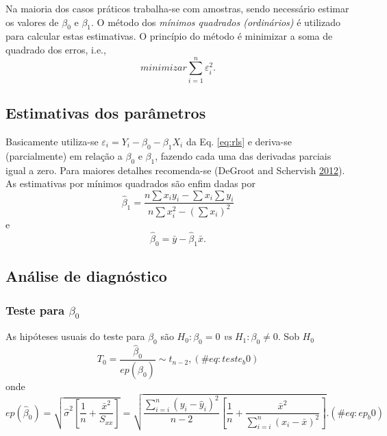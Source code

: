 \documentclass[
]{book}
\theoremstyle{definition}
\theoremstyle{definition}
\theoremstyle{definition}
\theoremstyle{remark}
\begin{document}
Na maioria dos casos práticos trabalha-se com amostras, sendo necessário estimar os valores de \(\beta_0\) e \(\beta_1\). O método dos \emph{mínimos quadrados (ordinários)} é utilizado para calcular estas estimativas. O princípio do método é minimizar a soma de quadrado dos erros, i.e.,
\begin{equation}
minimizar \sum_{i=1}^n \varepsilon_{i}^{2}.
\label{eq:mqo}
\end{equation}

\hypertarget{estimativas-dos-paruxe2metros}{%
\subsection{Estimativas dos parâmetros}\label{estimativas-dos-paruxe2metros}}

Basicamente utiliza-se \(\varepsilon_{i} = Y_{i} - \beta_0 - \beta_1 X_i\) da Eq. \eqref{eq:rls} e deriva-se (parcialmente) em relação a \(\beta_0\) e \(\beta_1\), fazendo cada uma das derivadas parciais igual a zero. Para maiores detalhes recomenda-se (DeGroot and Schervish \protect\hyperlink{ref-degroot2012probability}{2012}). As estimativas por mínimos quadrados são enfim dadas por
\begin{equation}
\hat{\beta}_1 = \frac{n \sum{x_i y_i} - \sum{x_i} \sum{y_i}}{n \sum{x_i^2} - (\sum{x_i})^2} 
\label{eq:beta1}
\end{equation}
e
\begin{equation}
\hat{\beta}_0 = \bar{y} - \hat{\beta}_1 \bar{x}.
\label{eq:beta0}
\end{equation}

\hypertarget{anuxe1lise-de-diagnuxf3stico}{%
\subsection{Análise de diagnóstico}\label{anuxe1lise-de-diagnuxf3stico}}

\hypertarget{teste-para-beta_0}{%
\subsubsection*{\texorpdfstring{Teste para \(\beta_0\)}{Teste para \textbackslash beta\_0}}\label{teste-para-beta_0}}

As hipóteses usuais do teste para \(\beta_0\) são \(H_0: \beta_0 = 0\) \emph{vs} \(H_1: \beta_0 \ne 0\). Sob \(H_0\)
\begin{equation}
T_0 = \frac{\hat{\beta}_0}{ep(\hat{\beta}_0)} \sim t_{n-2},
(\#eq:teste_b0)
\end{equation}
onde
\begin{equation}
ep(\hat{\beta}_0) = \sqrt{\hat{\sigma}^2 \left[ \frac{1}{n} + \frac{\bar{x}^2}{S_{xx}} \right] } = \sqrt{\frac{\sum_{i=i}^n (y_i - \hat{y}_i)^2}{n-2} \left[ \frac{1}{n} + \frac{\bar{x}^2}{\sum_{i=i}^n (x_i - \bar{x})^2} \right] }.
(\#eq:ep_b0)
\end{equation}
\end{document}

